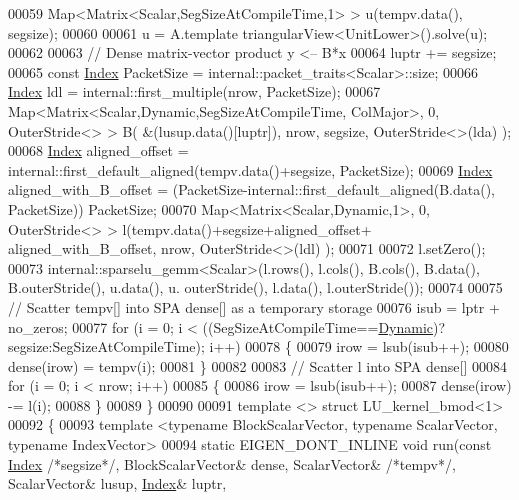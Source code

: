 \begin{DoxyCode}
00059   Map<Matrix<Scalar,SegSizeAtCompileTime,1> > u(tempv.data(), segsize);
00060   
00061   u = A.template triangularView<UnitLower>().solve(u); 
00062   
00063   \textcolor{comment}{// Dense matrix-vector product y <-- B*x }
00064   luptr += segsize;
00065   \textcolor{keyword}{const} \hyperlink{namespace_eigen_a62e77e0933482dafde8fe197d9a2cfde}{Index} PacketSize = internal::packet\_traits<Scalar>::size;
00066   \hyperlink{namespace_eigen_a62e77e0933482dafde8fe197d9a2cfde}{Index} ldl = internal::first\_multiple(nrow, PacketSize);
00067   Map<Matrix<Scalar,Dynamic,SegSizeAtCompileTime, ColMajor>, 0, OuterStride<> > B( &(lusup.data()[luptr]), 
      nrow, segsize, OuterStride<>(lda) );
00068   \hyperlink{namespace_eigen_a62e77e0933482dafde8fe197d9a2cfde}{Index} aligned\_offset = internal::first\_default\_aligned(tempv.data()+segsize, PacketSize);
00069   \hyperlink{namespace_eigen_a62e77e0933482dafde8fe197d9a2cfde}{Index} aligned\_with\_B\_offset = (PacketSize-internal::first\_default\_aligned(B.data(), PacketSize))%
      PacketSize;
00070   Map<Matrix<Scalar,Dynamic,1>, 0, OuterStride<> > l(tempv.data()+segsize+aligned\_offset+
      aligned\_with\_B\_offset, nrow, OuterStride<>(ldl) );
00071   
00072   l.setZero();
00073   internal::sparselu\_gemm<Scalar>(l.rows(), l.cols(), B.cols(), B.data(), B.outerStride(), u.data(), u.
      outerStride(), l.data(), l.outerStride());
00074   
00075   \textcolor{comment}{// Scatter tempv[] into SPA dense[] as a temporary storage }
00076   isub = lptr + no\_zeros;
00077   \textcolor{keywordflow}{for} (i = 0; i < ((SegSizeAtCompileTime==\hyperlink{namespace_eigen_ad81fa7195215a0ce30017dfac309f0b2}{Dynamic})?segsize:SegSizeAtCompileTime); i++)
00078   \{
00079     irow = lsub(isub++); 
00080     dense(irow) = tempv(i);
00081   \}
00082   
00083   \textcolor{comment}{// Scatter l into SPA dense[]}
00084   \textcolor{keywordflow}{for} (i = 0; i < nrow; i++)
00085   \{
00086     irow = lsub(isub++); 
00087     dense(irow) -= l(i);
00088   \} 
00089 \}
00090 
00091 \textcolor{keyword}{template} <> \textcolor{keyword}{struct }LU\_kernel\_bmod<1>
00092 \{
00093   \textcolor{keyword}{template} <\textcolor{keyword}{typename} BlockScalarVector, \textcolor{keyword}{typename} ScalarVector, \textcolor{keyword}{typename} IndexVector>
00094   \textcolor{keyword}{static} EIGEN\_DONT\_INLINE \textcolor{keywordtype}{void} run(\textcolor{keyword}{const} \hyperlink{namespace_eigen_a62e77e0933482dafde8fe197d9a2cfde}{Index} \textcolor{comment}{/*segsize*/}, BlockScalarVector& dense, ScalarVector& \textcolor{comment}{
      /*tempv*/}, ScalarVector& lusup, \hyperlink{namespace_eigen_a62e77e0933482dafde8fe197d9a2cfde}{Index}& luptr,

\end{DoxyCode}
